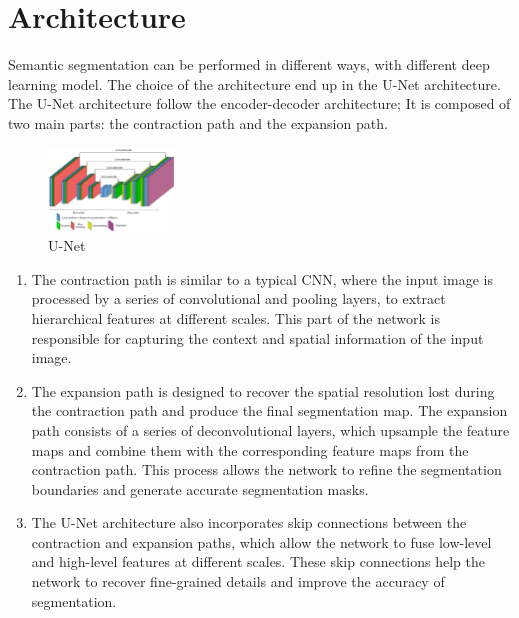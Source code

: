 \documentclass{article}
\begin{document}
\section{Architecture}\label{sec:architecture}
Semantic segmentation can be performed in different ways, with different deep learning model. The choice of the architecture end up in the U-Net architecture. The U-Net architecture follow the encoder-decoder architecture; It is composed of two main parts: the contraction path and the expansion path.
\begin{figure}[H]
        \begin{center}
        \includegraphics[width=0.3\textwidth]{img/U-Net.png}
        \caption{U-Net}
        \label{fig:unet}
    \end{center}
\end{figure} 
\begin{enumerate}
    \item The contraction path is similar to a typical CNN, where the input image is processed by a series of convolutional and pooling layers, to extract hierarchical features at different scales. This part of the network is responsible for capturing the context and spatial information of the input image.
    \item The expansion path is designed to recover the spatial resolution lost during the contraction path and produce the final segmentation map. The expansion path consists of a series of deconvolutional layers, which upsample the feature maps and combine them with the corresponding feature maps from the contraction path. This process allows the network to refine the segmentation boundaries and generate accurate segmentation masks.
    \item The U-Net architecture also incorporates skip connections between the contraction and expansion paths, which allow the network to fuse low-level and high-level features at different scales. These skip connections help the network to recover fine-grained details and improve the accuracy of segmentation.
\end{enumerate}
\end{document}
